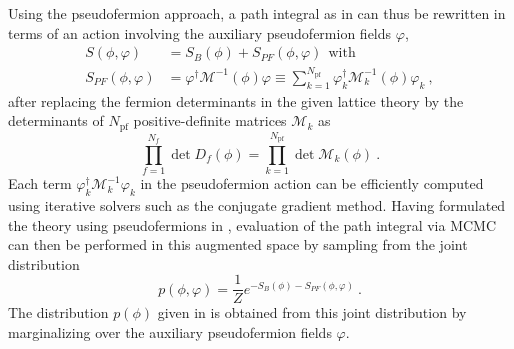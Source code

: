 \documentclass[aps,prd,twocolumn,nofootinbib,superscriptaddress,preprintnumbers]{revtex4-1}
\newcommand{\pf}{\mathrm{pf}}
\begin{document}
Using the pseudofermion approach, a path integral as in  can thus be rewritten in terms of an action involving the auxiliary pseudofermion fields $\varphi$,
%
\begin{equation}\label{eq:pseudo-action}
\begin{aligned}
    S(\phi,\varphi) &= S_{B}(\phi) + S_{PF}(\phi,\varphi) \ \ \text{with}\ \\
    S_{PF}(\phi,\varphi) &= \varphi^\dag \mathcal{M}^{-1}(\phi) \varphi \equiv \sum_{k=1}^{N_{\pf}} \varphi_k^\dag \mathcal{M}_k^{-1}(\phi) \varphi_k \ ,
\end{aligned}
\end{equation}
%
after replacing the fermion determinants in the given lattice theory by the determinants of $N_{\pf}$ positive-definite matrices $\mathcal{M}_k$ as
%
\begin{equation}
    \prod_{f=1}^{N_{f}} \det D_f(\phi) = \prod_{k=1}^{N_{\pf}} \det \mathcal{M}_k(\phi)\ .
\end{equation}
%
Each term $\varphi^{\dagger}_k \mathcal{M}_k^{-1} \varphi_k$ in the pseudofermion action can be efficiently computed using iterative solvers such as the conjugate gradient method. Having formulated the theory using pseudofermions in , evaluation of the path integral via MCMC can then be performed in this augmented space by sampling from the joint distribution
%
\begin{equation}\label{eq:joint-dist}
    p(\phi,\varphi) = \frac{1}{Z} e^{-S_{B}(\phi) - S_{PF}(\phi,\varphi)}\ .
\end{equation}
%
The distribution $p(\phi)$ given in  is obtained from this joint distribution by marginalizing over the auxiliary pseudofermion fields $\varphi$.
\end{document}
